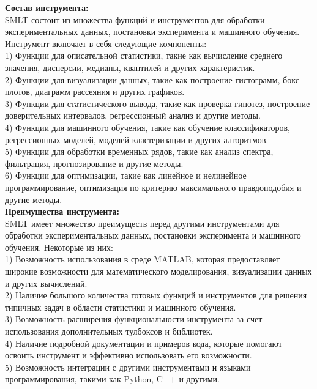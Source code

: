 \documentclass[a4paper, 12pt]{article}%
\begin{document}
\begin{titlepage}
	\textbf{Состав инструмента:}\\
	SMLT состоит из множества функций и инструментов для обработки экспериментальных данных, постановки эксперимента и машинного обучения. Инструмент включает в себя следующие компоненты:\\
	1) Функции для описательной статистики, такие как вычисление среднего значения, дисперсии, медианы, квантилей и других характеристик.\\
	2) Функции для визуализации данных, такие как построение гистограмм, бокс-плотов, диаграмм рассеяния и других графиков.\\
	3) Функции для статистического вывода, такие как проверка гипотез, построение доверительных интервалов, регрессионный анализ и другие методы.\\
	4) Функции для машинного обучения, такие как обучение классификаторов, регрессионных моделей, моделей кластеризации и других алгоритмов.\\
	5) Функции для обработки временных рядов, такие как анализ спектра, фильтрация, прогнозирование и другие методы.\\
	6) Функции для оптимизации, такие как линейное и нелинейное программирование, оптимизация по критерию максимального правдоподобия и другие методы.\\
	
	
	\textbf{Преимущества инструмента:}\\
	SMLT имеет множество преимуществ перед другими инструментами для обработки экспериментальных данных, постановки эксперимента и машинного обучения. Некоторые из них:\\
	1) Возможность использования в среде MATLAB, которая предоставляет широкие возможности для математического моделирования, визуализации данных и других вычислений.\\
	2) Наличие большого количества готовых функций и инструментов для решения типичных задач в области статистики и машинного обучения.\\
	3) Возможность расширения функциональности инструмента за счет использования дополнительных тулбоксов и библиотек.\\
	4) Наличие подробной документации и примеров кода, которые помогают освоить инструмент и эффективно использовать его возможности.\\
	5) Возможность интеграции с другими инструментами и языками программирования, такими как Python, C++ и другими.\\
	

\end{titlepage}
\end{document}
